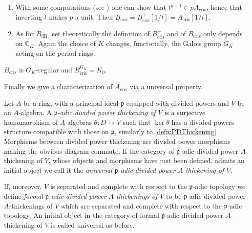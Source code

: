 \begin{rem}[]\leavevmode\vspace{-.2\baselineskip}
\begin{enumerate}
\item With some computations (see \cite[Proposition 9.1.3]{Brinon})
	one can show that $t^{p-1} \in p A_{\mathrm{cris}}$, hence that 
	inverting $t$ makes $p$ a unit.
	Then $B_{\mathrm{cris}} = B_{\mathrm{cris}}^+[1/t] = A_{\mathrm{cris}}[1/t]$.

\item As for $B_{\mathrm{dR}}$, set theoretically the definition of $B_{\mathrm{cris}}^+$ and
	of $B_{\mathrm{cris}}$ only depends on $\mathbb{C}_{K}$.
	Again the choice of $K$ changes, functorially, the Galois group $G_K$ acting on the
	period rings.
\end{enumerate}
\end{rem}


\begin{prop}
	$B_{\mathrm{cris}}$ is $G_K$-regular
	and $B_{\mathrm{cris}}^{G_K} = K_0$.
\end{prop}


\noindent
Finally we give a characterization of $A_{\mathrm{cris}}$ via
a universal property.
\begin{defn}
	Let $A$ be a ring, with a principal ideal $\mathfrak{p}$
	equipped with divided powers and $V$ be an $A$-algebra.
	A {\em $\mathfrak{p}$-adic divided power thickening of $V$}
	is a surjective homomorphism of $A$-algebras
	$\theta\colon D \to V$ such that $\ker \theta$ has a divided powers structure
	compatible with those on $\mathfrak{p}$, similarly to \cref{defn:PDThickening}.
	Morphisms between divided power thickening are divided power morphisms
	making the obvious diagram commute.
	If the category of $\mathfrak{p}$-adic divided power $A$-thickening of $V$,
	whose objects and morphisms have just been defined, admits an initial object
	we call it the {\em universal $\mathfrak{p}$-adic divided power $A$-thickening of $V$}.
	
	If, moreover, $V$ is separated and complete with respect to the $\mathfrak{p}$-adic topology
	we define {\em formal $\mathfrak{p}$-adic divided power $A$-thickenings of $V$} to be
	$\mathfrak{p}$-adic divided power $A$-thickenings of $V$ which are separated and complete
	with respect to the $\mathfrak{p}$-adic topology.
	An initial object in the category of formal $\mathfrak{p}$-adic divided power $A$-thickening
	of $V$ is called universal as before.
\end{defn}


